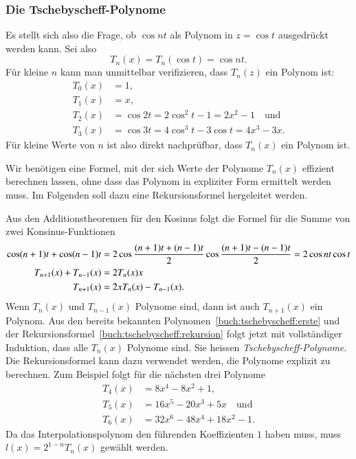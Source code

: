 \subsubsection{Die Tschebyscheff-Polynome}
Es stellt sich also die Frage, ob $\cos nt$ als Polynom in $z=\cos t$
ausgedrückt werden kann.
Sei also
\[
T_n(x)
=
T_n(\cos t)
= 
\cos nt.
\]
Für kleine $n$ kann man unmittelbar verifizieren, dass $T_n(z)$ ein
Polynom ist:
\begin{equation}
\begin{aligned}
T_0(x) &= 1,\\
T_1(x) &= x,\\
T_2(x) &= \cos 2t = 2\cos^2 t-1 = 2x^2 -1
\quad\text{und}
\\
T_3(x) &= \cos 3t = 4\cos^3 t - 3\cos t = 4x^3-3x.
\end{aligned}
\label{buch:tschebyscheff:erste}
\end{equation}
Für kleine Werte von $n$ ist also direkt nachprüfbar, dass $T_n(x)$
ein Polynom ist.

Wir benötigen eine Formel, mit der sich Werte der Polynome $T_n(x)$
effizient berechnen lassen, ohne dass das Polynom in expliziter
Form ermittelt werden muss.
Im Folgenden soll dazu eine Rekursionsformel hergeleitet werden.

Aus den Additionstheoremen für den Kosinus folgt die Formel für die
Summe von zwei Konsinus-Funktionen
\begin{align}
\cos (n+1)t + \cos(n-1)t
&=
2 \cos \frac{(n+1)t + (n-1)t}2 \cos \frac{(n+1)t -(n-1)t}2
=
2\cos nt \cos t
\notag
\\
T_{n+1}(x)+T_{n-1}(x)&=2T_n(x)x
\notag
\\
T_{n+1}(x) &= 2xT_n(x) - T_{n-1}(x).
\label{buch:tschebyscheff:rekursion}
\end{align}
Wenn $T_n(x)$ und $T_{n-1}(x)$ Polynome sind, dann ist auch $T_{n+1}(x)$
ein Polynom.
Aus den bereits bekannten Polynomen~\eqref{buch:tschebyscheff:erste} und
der Rekursionsformel~\eqref{buch:tschebyscheff:rekursion} folgt jetzt mit
vollständiger Induktion, dass alle $T_n(x)$ Polynome sind.
Sie heissen {\em Tschebyscheff-Polynome}.
Die Rekursionsformel kann dazu verwendet werden, die Polynome explizit
zu berechnen.
Zum Beispiel folgt für die nächsten drei Polynome
\begin{align*}
T_4(x) &= 8x^4-8x^2 + 1,
\\
T_5(x) &= 16x^5-20x^3+5x \quad\text{und}
\\
T_6(x) &= 32x^6-48x^4+18x^2-1.
\end{align*}
Da das Interpolationspolynom den führenden Koeffizienten $1$ haben muss,
muss $l(x) = 2^{1-n}T_n(x)$ gewählt werden.

